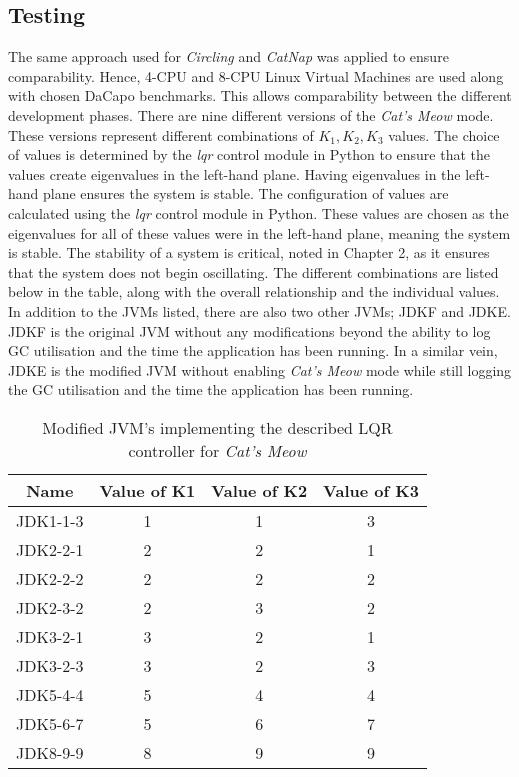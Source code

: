 \subsection{Testing}
The same approach used for \emph{Circling} and \emph{CatNap} was applied to
ensure comparability. Hence, 4-CPU and 8-CPU Linux Virtual Machines
are used along with chosen DaCapo benchmarks. This allows comparability
between the different development phases.
\newline\newline
There are nine different versions of the \emph{Cat's Meow} mode. These versions
represent different combinations of \begin{math}  K_{1}, K_{2}, K_{3} \end{math} values. The choice
of values is determined by the \emph{lqr} control module in Python to ensure
that the values create eigenvalues in the left-hand plane. Having
eigenvalues in the left-hand plane ensures the system is stable. The
configuration of values are calculated using the \emph{lqr} control module in Python. These
values are chosen as the eigenvalues for all of these values were in the
left-hand plane, meaning the system is stable. The stability of a system
is critical, noted in Chapter 2, as it ensures that the system does
not begin oscillating.
\newline\newline
The different combinations are listed below in the table, along with the
overall relationship and the individual values. In addition to the JVMs
listed, there are also two other JVMs; JDKF and JDKE. JDKF is the
original JVM without any modifications beyond the ability to log GC
utilisation and the time the application has been running. In a similar
vein, JDKE is the modified JVM without enabling \emph{Cat's Meow} mode while
still logging the GC utilisation and the time the application has been
running.
\newline\newline
\begin{table}[H]
\begin{tabular}[]{|c|c|c|c|}
\hline
Name & Value of K1 & Value of K2 & Value of K3\tabularnewline
\hline
JDK1-1-3 & 1 & 1 & 3\tabularnewline \hline

JDK2-2-1 & 2 & 2 & 1\tabularnewline \hline

JDK2-2-2 & 2 & 2 & 2\tabularnewline \hline

JDK2-3-2 & 2 & 3 & 2\tabularnewline \hline

JDK3-2-1 & 3 & 2 & 1\tabularnewline \hline

JDK3-2-3 & 3 & 2 & 3\tabularnewline \hline

JDK5-4-4 & 5 & 4 & 4\tabularnewline \hline

JDK5-6-7 & 5 & 6 & 7\tabularnewline \hline

JDK8-9-9 & 8 & 9 & 9\tabularnewline \hline
\end{tabular}
\caption{Modified JVM's implementing the described LQR controller for \emph{Cat's
Meow}}
\end{table}
